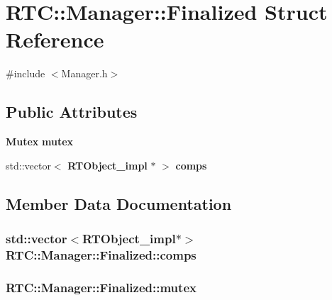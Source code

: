 \section{RTC::Manager::Finalized Struct Reference}
\label{structRTC_1_1Manager_1_1Finalized}


{\ttfamily \#include $<$Manager.h$>$}

\subsection*{Public Attributes}
\begin{DoxyCompactItemize}
\item 
{\bf Mutex} {\bf mutex}
\item 
std::vector$<$ {\bf RTObject\_\-impl} $\ast$ $>$ {\bf comps}
\end{DoxyCompactItemize}


\subsection{Member Data Documentation}
\subsubsection[{comps}]{\setlength{\rightskip}{0pt plus 5cm}std::vector$<${\bf RTObject\_\-impl}$\ast$$>$ {\bf RTC::Manager::Finalized::comps}}\label{structRTC_1_1Manager_1_1Finalized_add3526b268ef3d0fd43c8603dbda9aa9}
\subsubsection[{mutex}]{ {\bf RTC::Manager::Finalized::mutex}}\label{structRTC_1_1Manager_1_1Finalized_a1d6c77f44b768021ad3f9fe06f09f590}
